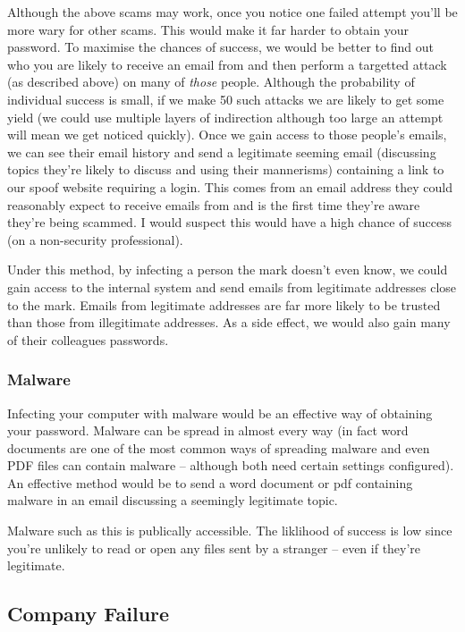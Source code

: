 \documentclass[10pt,\jkfside,a4paper]{article}
\begin{document}
\begin{enumerate}
Although the above scams may work, once you notice one failed attempt you'll be more wary for other scams.
This would make it far harder to obtain your password. To maximise the chances of 
success, we would be better to find out who you are likely to receive an email from and 
then perform a targetted attack (as described above) on many of \textit{those} people. 
Although the probability of individual success is small, if we make 50 such attacks we are likely 
to get some yield (we could use multiple layers of indirection although too large an attempt will 
mean we get noticed quickly). Once we gain access to those people's emails, we can see their email 
history and send a legitimate seeming email (discussing topics they're likely to discuss and using 
their mannerisms) containing a link to our spoof website requiring a login. This comes from an email 
address they could reasonably expect to receive emails from and is the first time they're aware they're 
being scammed. I would suspect this would have a high chance of success (on a non-security professional).

Under this method, by infecting a person the mark doesn't even know, we could gain access to the internal 
system and send emails from legitimate addresses close to the mark. Emails from legitimate addresses 
are far more likely to be trusted than those from illegitimate addresses. As a 
side effect, we would also gain many of their colleagues passwords.

\subsubsection*{Malware}

Infecting your computer with malware would be an effective way of obtaining your password. Malware 
can be spread in almost every way (in fact word documents are one of the most common ways of spreading 
malware and even PDF files can contain malware -- although both need certain settings configured). An 
effective method would be to send a word document or pdf containing malware in an email discussing a 
seemingly legitimate topic.

Malware such as this is publically accessible. The liklihood of success is low since you're unlikely 
to read or open any files sent by a stranger -- even if they're legitimate.

\subsection*{Company Failure}


\end{enumerate}
\end{document}
